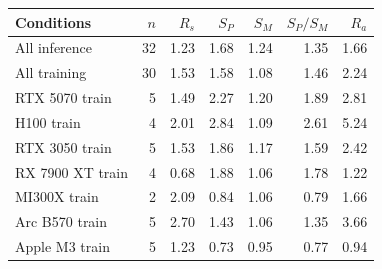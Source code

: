 \begin{tabular}{@{}lrrrrrr@{}}
\toprule
Conditions & $n$ & $R_s$ & $S_P$ & $S_M$ & $S_P/S_M$ & $R_a$ \\
\midrule
All inference & 32 & 1.23 & 1.68 & 1.24 & 1.35 & 1.66 \\
All training & 30 & 1.53 & 1.58 & 1.08 & 1.46 & 2.24 \\
\midrule
RTX 5070 train & 5 & 1.49 & 2.27 & 1.20 & 1.89 & 2.81 \\
H100 train & 4 & 2.01 & 2.84 & 1.09 & 2.61 & 5.24 \\
RTX 3050 train & 5 & 1.53 & 1.86 & 1.17 & 1.59 & 2.42 \\
RX 7900 XT train & 4 & 0.68 & 1.88 & 1.06 & 1.78 & 1.22 \\
MI300X train & 2 & 2.09 & 0.84 & 1.06 & 0.79 & 1.66 \\
Arc B570 train & 5 & 2.70 & 1.43 & 1.06 & 1.35 & 3.66 \\
Apple M3 train & 5 & 1.23 & 0.73 & 0.95 & 0.77 & 0.94 \\
\bottomrule
\end{tabular}
